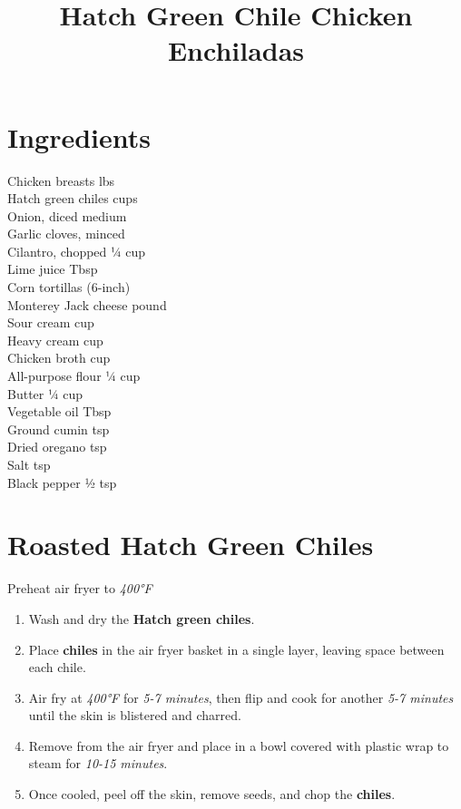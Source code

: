 \documentclass[11pt,letterpaper]{article}
\title{Hatch Green Chile Chicken Enchiladas}
\author{}
\date{}
\begin{document}
\maketitle
\thispagestyle{empty}

\section*{Ingredients}
\setlength{\columnsep}{20pt}
\begin{multicols}{2}
\noindent
    Chicken breasts  lbs \\
    Hatch green chiles  cups \\
    Onion, diced  medium \\
    Garlic cloves, minced  \\
    Cilantro, chopped \dotfill ¼ cup \\
    Lime juice  Tbsp \\
    Corn tortillas  (6-inch) \\
    Monterey Jack cheese  pound \\
    \columnbreak
    Sour cream  cup \\
    Heavy cream  cup \\
    Chicken broth  cup \\
    All-purpose flour \dotfill ¼ cup \\
    Butter \dotfill ¼ cup \\
    Vegetable oil  Tbsp \\
    Ground cumin  tsp \\
    Dried oregano  tsp \\
    Salt  tsp \\
    Black pepper \dotfill ½ tsp \\
\end{multicols}

\section*{Roasted Hatch Green Chiles}
Preheat air fryer to \textit{400°F}

\begin{enumerate}
    \item Wash and dry the \textbf{Hatch green chiles}.
    \item Place \textbf{chiles} in the air fryer basket in a single layer, leaving space between each chile.
    \item Air fry at \textit{400°F} for \textit{5-7 minutes}, then flip and cook for another \textit{5-7 minutes} until the skin is blistered and charred.
    \item Remove from the air fryer and place in a bowl covered with plastic wrap to steam for \textit{10-15 minutes}.
    \item Once cooled, peel off the skin, remove seeds, and chop the \textbf{chiles}.
\end{enumerate}
\end{document}

